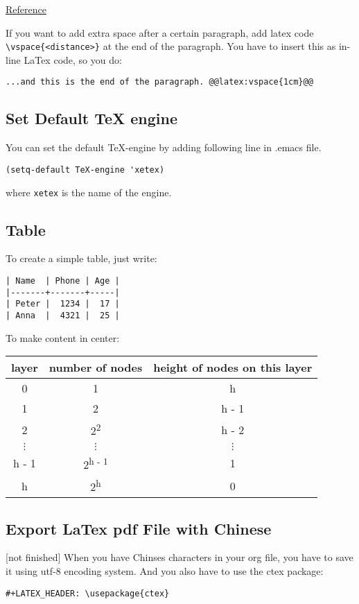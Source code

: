 \documentclass[11pt]{article}
\begin{document}
\href{https://emacs.stackexchange.com/questions/22755/separation-between-paragraphs-when-exporting-to-pdf-from-org-mode}{Reference}

If you want to add extra space after a certain paragraph, add latex code \texttt{\textbackslash{}vspace\{<distance>\}} at the end of the paragraph. You have to insert this as in-line LaTex code, so you do:  \vspace{3cm}
\begin{Verbatim}[frame=single]
...and this is the end of the paragraph. @@latex:vspace{1cm}@@

\end{Verbatim}



\subsection{Set Default \TeX{} engine}
\label{sec:org0fe3d94}
You can set the default \TeX{}-engine by adding following line in .emacs file.
\begin{Verbatim}[frame=single]
(setq-default TeX-engine 'xetex)
\end{Verbatim}
where \texttt{xetex} is the name of the engine.
\subsection{Table}
\label{sec:org86ba24e}
To create a simple table, just write:
\begin{Verbatim}[frame=single]
| Name  | Phone | Age |
|-------+-------+-----|
| Peter |  1234 |  17 |
| Anna  |  4321 |  25 |
\end{Verbatim}

To make content in center:
\begin{center}
\begin{tabular}{ccc}
\hline
layer & number of nodes & height of nodes on this layer\\
\hline
0 & 1 & h\\
1 & 2 & h - 1\\
2 & 2\textsuperscript{2} & h - 2\\
\(\vdots\) & \(\vdots\) & \(\vdots\)\\
h - 1 & 2\textsuperscript{h - 1} & 1\\
h & 2\textsuperscript{h} & 0\\
\hline
\end{tabular}
\end{center}

\subsection{Export LaTex pdf File with Chinese}
\label{sec:orgb35de4d}
[not finished]
When you have Chinses characters in your org file, you have to save it using utf-8 encoding system. And you also have to use the ctex package:
\begin{Verbatim}[frame=single]
#+LATEX_HEADER: \usepackage{ctex}
\end{Verbatim}
\end{document}
